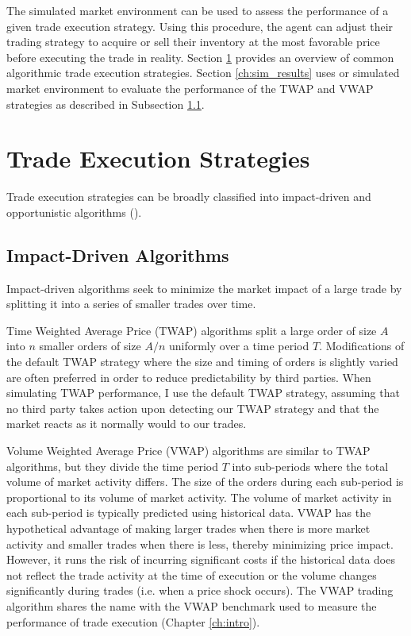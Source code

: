 The simulated market environment can be used to assess the performance of a given trade execution strategy. Using this procedure, the agent can adjust their trading strategy to acquire or sell their inventory at the most favorable price before executing the trade in reality. Section \ref{ch:strategies} provides an overview of common algorithmic trade execution strategies. Section \ref{ch:sim_results} uses or simulated market environment to evaluate the performance of the TWAP and VWAP strategies as described in Subsection \ref{ch:impact-driven}.

\section{Trade Execution Strategies} \label{ch:strategies}
Trade execution strategies can be broadly classified into impact-driven and opportunistic algorithms (\cite{labadie:hal-00590283}).

\subsection{Impact-Driven Algorithms} \label{ch:impact-driven}
Impact-driven algorithms seek to minimize the market impact of a large trade by splitting it into a series of smaller trades over time. 

Time Weighted Average Price (TWAP) algorithms split a large order of size $A$ into $n$ smaller orders of size $A/n$ uniformly over a time period $T$. Modifications of the default TWAP strategy where the size and timing of orders is slightly varied are often preferred in order to reduce predictability by third parties. When simulating TWAP performance, I use the default TWAP strategy, assuming that no third party takes action upon detecting our TWAP strategy and that the market reacts as it normally would to our trades.

Volume Weighted Average Price (VWAP) algorithms are similar to TWAP algorithms, but they divide the time period $T$ into sub-periods where the total volume of market activity differs. The size of the orders during each sub-period is proportional to its volume of market activity. The volume of market activity in each sub-period is typically predicted using historical data. VWAP has the hypothetical advantage of making larger trades when there is more market activity and smaller trades when there is less, thereby minimizing price impact. However, it runs the risk of incurring significant costs if the historical data does not reflect the trade activity at the time of execution or the volume changes significantly during trades (i.e. when a price shock occurs). The VWAP trading algorithm shares the name with the VWAP benchmark used to measure the performance of trade execution (Chapter \ref{ch:intro}).

